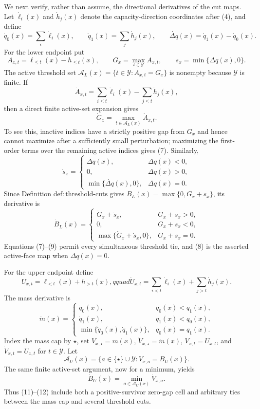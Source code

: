 We next verify, rather than assume, the directional derivatives of the cut maps.  Let \(\dot\ell_i(x)\) and \(\dot h_j(x)\) denote the capacity-direction coordinates after (4), and define
\[
\dot q_0(x)=\sum_i\dot\ell_i(x),\qquad
\dot q_1(x)=\sum_j\dot h_j(x),\qquad
\dot{\Delta q}(x)=\dot q_1(x)-\dot q_0(x).
\tag{5}
\]
For the lower endpoint put
\[
A_{x,t}=\ell_{\le t}(x)-h_{\le t}(x),\qquad
G_x=\max_{t\in\mathcal Y}A_{x,t},\qquad
s_x=\min\{\Delta q(x),0\}.
\tag{6}
\]
The active threshold set \(\mathcal A_L(x)=\{t\in\mathcal Y:A_{x,t}=G_x\}\) is nonempty because \(\mathcal Y\) is finite.  If
\[
\dot A_{x,t}=\sum_{i\le t}\dot\ell_i(x)-\sum_{j\le t}\dot h_j(x),
\]
then a direct finite active-set expansion gives
\[
\dot G_x=\max_{t\in\mathcal A_L(x)}\dot A_{x,t}.
\tag{7}
\]
To see this, inactive indices have a strictly positive gap from \(G_x\) and hence cannot maximize after a sufficiently small perturbation; maximizing the first-order terms over the remaining active indices gives (7).  Similarly,
\[
\dot s_x=
\begin{cases}
\dot{\Delta q}(x),&\Delta q(x)<0,\\
0,&\Delta q(x)>0,\\
\min\{\dot{\Delta q}(x),0\},&\Delta q(x)=0.
\end{cases}
\tag{8}
\]
Since Definition \(\mathrm{def{:}threshold\text{-}cuts}\) gives \(B_L(x)=\max\{0,G_x+s_x\}\), its derivative is
\[
\dot B_L(x)=
\begin{cases}
\dot G_x+\dot s_x,&G_x+s_x>0,\\
0,&G_x+s_x<0,\\
\max\{\dot G_x+\dot s_x,0\},&G_x+s_x=0.
\end{cases}
\tag{9}
\]
Equations (7)--(9) permit every simultaneous threshold tie, and (8) is the asserted active-face map when \(\Delta q(x)=0\).

For the upper endpoint define
\[
U_{x,t}=\ell_{<t}(x)+h_{>t}(x),qquad
\dot U_{x,t}=\sum_{i<t}\dot\ell_i(x)+\sum_{j>t}\dot h_j(x).
\tag{10}
\]
The mass derivative is
\[
\dot m(x)=
\begin{cases}
\dot q_0(x),&q_0(x)<q_1(x),\\
\dot q_1(x),&q_1(x)<q_0(x),\\
\min\{\dot q_0(x),\dot q_1(x)\},&q_0(x)=q_1(x).
\end{cases}
\tag{11}
\]
Index the mass cap by \(\star\), set \(V_{x,\star}=m(x)\), \(\dot V_{x,\star}=\dot m(x)\), \(V_{x,t}=U_{x,t}\), and \(\dot V_{x,t}=\dot U_{x,t}\) for \(t\in\mathcal Y\).  Let
\[
\mathcal A_U(x)=\{a\in\{\star\}\cup\mathcal Y:V_{x,a}=B_U(x)\}.
\]
The same finite active-set argument, now for a minimum, yields
\[
\dot B_U(x)=\min_{a\in\mathcal A_U(x)}\dot V_{x,a}.
\tag{12}
\]
Thus (11)--(12) include both a positive-survivor zero-gap cell and arbitrary ties between the mass cap and several threshold cuts.

